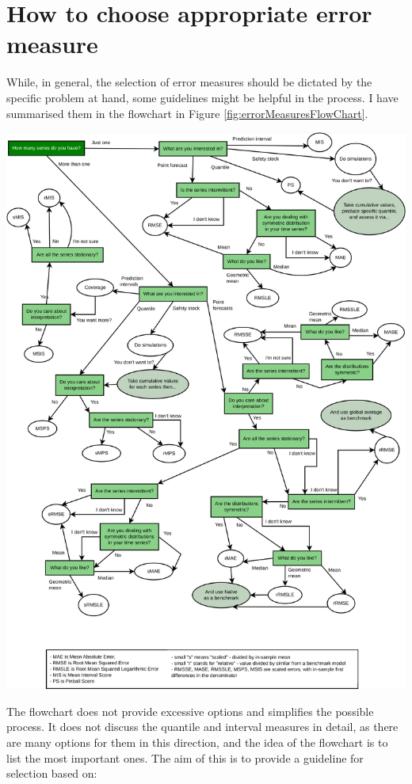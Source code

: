 \documentclass[
]{book}
\theoremstyle{definition}
\theoremstyle{definition}
\theoremstyle{definition}
\theoremstyle{definition}
\theoremstyle{remark}
\begin{document}
\hypertarget{errorMeasuresSelection}{%
\section{How to choose appropriate error measure}\label{errorMeasuresSelection}}

While, in general, the selection of error measures should be dictated by the specific problem at hand, some guidelines might be helpful in the process. I have summarised them in the flowchart in Figure \ref{fig:errorMeasuresFlowChart}.

\includegraphics{./images/errorMeasuresFlowChart.pdf}

The flowchart does not provide excessive options and simplifies the possible process. It does not discuss the quantile and interval measures in detail, as there are many options for them in this direction, and the idea of the flowchart is to list the most important ones. The aim of this is to provide a guideline for selection based on:
\end{document}
